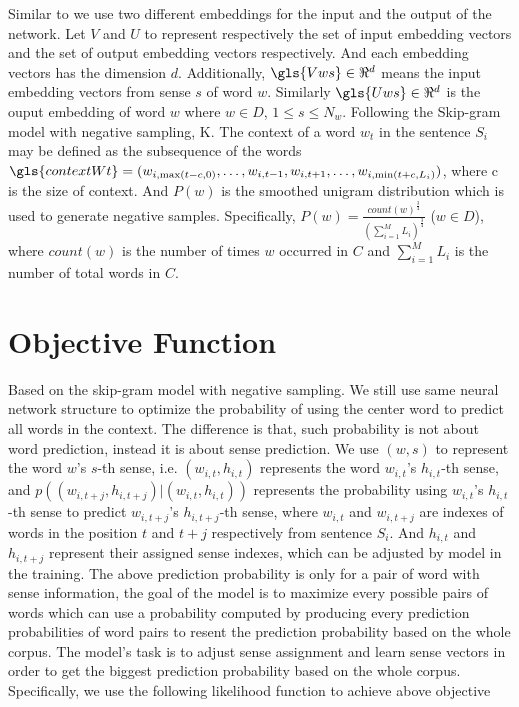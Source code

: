 Similar to \cite{MikolovSutskeverEtAl2013} we use two different embeddings for the input and the output of the network.
Let $V$ and $U$ to represent respectively the set of input embedding vectors and the set of output embedding vectors respectively. And each embedding vectors has the dimension $d$. Additionally, $\gls{Vws} \in \Re^d$ %
means the input embedding vectors from sense $s$ of word $w$. Similarly
$\gls{Uws} \in \Re^d$ %
is the ouput embedding of word $w$ where  $w\in D$, $1\leq s\leq N_w$. Following the Skip-gram model with negative sampling, \gls{K}. %
The context  of a word $w_t$ in the sentence $S_i$ may be defined as the subsequence of the words  
$\gls{contextWt} = (w_{i,\max(t-c,0)},\ldots,w_{i,t-1},w_{i,t+1},\ldots,w_{i,\min(t+c,L_i)})$,  
where \gls{c} %
is the size of context. And $P(w)$ 
is the smoothed unigram distribution which is used to generate negative samples. Specifically, $P(w) = \frac{count(w)^{\frac{3}{4}}}{(\sum_{i=1}^M L_i)^{\frac{3}{4}}}$ ($w\in D$), where $count(w)$ is the number of times $w$ occurred in $C$ and $\sum_{i=1}^M L_i$ is the number of total words in $C$.

\section{Objective Function}

Based on the skip-gram model with negative sampling. We still use same neural network structure to optimize the probability of using the center word to predict all words in the context. The difference is that, such probability is not about word prediction, instead it is about sense prediction. We use $(w,s)$ to represent the word $w$'s $s$-th sense, i.e. $(w_{i,t},h_{i,t})$ represents the word $w_{i,t}$'s $h_{i,t}$-th sense, and $p((w_{i,t+j},h_{i,t+j})|(w_{i,t},h_{i,t}))$ represents the probability using $w_{i,t}$'s $h_{i,t}$-th sense to predict $w_{i,t+j}$'s $h_{i,t+j}$-th sense, where $w_{i,t}$ and $w_{i,t+j}$ are indexes of words in the position $t$ and $t+j$ respectively from sentence $S_i$. And $h_{i,t}$ and $h_{i,t+j}$ represent their assigned sense indexes, which can be adjusted by model in the training. The above prediction probability is only for a pair of word with sense information, the goal of the model is to maximize every possible pairs of words which can use a probability computed by producing every prediction probabilities of word pairs to resent the prediction probability based on the whole corpus. The model's task is to adjust sense assignment and learn sense vectors in order to get the biggest prediction probability based on the whole corpus. Specifically, we use the following likelihood function to achieve above objective

